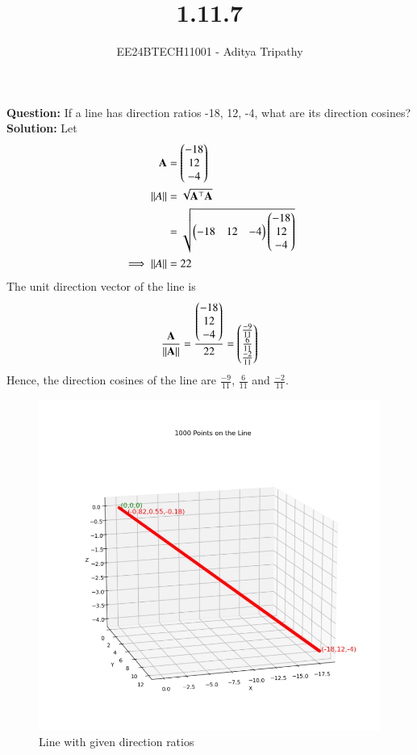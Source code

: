 \documentclass[journal]{IEEEtran}
\begin{document}

\vspace{3cm}

\title{1.11.7}
\author{EE24BTECH11001 - Aditya Tripathy
}
{\let\newpage\relax\maketitle}

\renewcommand{\thefigure}{\theenumi}
\renewcommand{\thetable}{\theenumi}
\setlength{\intextsep}{10pt} %

\textbf{Question:}
\newline
If a line has direction ratios -18, 12, -4, what are its direction cosines?\\
\textbf{Solution:}
Let 
\begin{align}
	\mathbf{A} &= \begin{pmatrix}-18\\12\\-4\end{pmatrix}\\
	\left\lVert A\right\rVert &= \sqrt{\mathbf{A}^\top\mathbf{A}}\\
		     &= \sqrt{\begin{pmatrix}-18 & 12 & -4\end{pmatrix}\begin{pmatrix}-18\\12\\-4\end{pmatrix}}\\
	\implies \left\lVert A\right\rVert &= 22
\end{align}
The unit direction vector of the line is
\begin{align}
	\frac{\mathbf{A}}{\left\lVert\mathbf{A}\right\rVert} = \frac{\begin{pmatrix}-18\\12\\-4\end{pmatrix}}{22} = \begin{pmatrix}\frac{-9}{11}\\\frac{6}{11}\\\frac{-2}{11}\end{pmatrix}
\end{align}
Hence, the direction cosines of the line are $\frac{-9}{11}$, $\frac{6}{11}$ and $\frac{-2}{11}$.

\begin{figure}[h!]
   \centering
   \includegraphics[width=0.7\linewidth]{figs/fig.png}
   \caption{Line with given direction ratios}
\end{figure}
\end{document}
